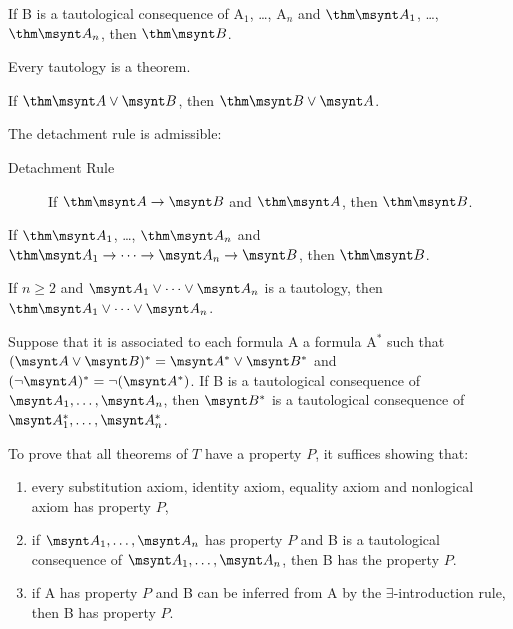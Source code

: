 \begin{theorem}
	If \synt B is a tautological consequence of \synt A$_1$, \dots, 
	\synt A$_n$ and $\thm \msynt A_1$, \dots, $\thm \msynt A_n$,
	then $\thm \msynt B$.
\end{theorem}

\begin{corollary}
	Every tautology is a theorem.
\end{corollary}

\begin{lemma}
	If $\thm \msynt A \lor \msynt B$, then $\thm \msynt B \lor \msynt A$.
\end{lemma}

\begin{fact}
	The detachment rule is admissible: %
	\begin{description}
		\item[Detachment Rule] If $\thm \msynt A \to \msynt B$ and 
		$\thm \msynt A$, then $\thm \msynt B$.
	\end{description}
\end{fact}

\begin{corollary}
	If $\thm \msynt A_1$, \dots, $\thm \msynt A_n$ and
	$\thm \msynt A_1\to \dots\to\msynt A_n\to\msynt B$, then
	$\thm \msynt B$.
\end{corollary}

\begin{lemma}
	If $n\ge 2$ and $\msynt A_1 \lor \dots \lor \msynt A_n$ is a tautology,
	then $\thm \msynt A_1 \lor \dots \lor \msynt A_n$.
\end{lemma}

\begin{fact}
	Suppose that it is associated to each formula \synt A a formula \synt A$^*$
	such that $(\msynt A \lor \msynt B)^* = \msynt A^* \lor \msynt B^*$ and 
	$(\lnot \msynt A)^* = \lnot (\msynt A^*)$. If \synt B is a tautological
	consequence of $\msynt A_1, \dots, \msynt A_n$, then $\msynt B^*$ is a tautological
	consequence of $\msynt A_1^*, \dots, \msynt A_n^*$.
\end{fact}

\begin{fact}
	To prove that all theorems of $T$ have a property $P$, it suffices showing 
	that:
	\begin{enumerate}
		\item every substitution axiom, identity axiom, equality axiom and nonlogical axiom
		has property $P$,
		\item if $\msynt A_1,\dots,\msynt A_n$ has property $P$ and \synt B is a tautological
		consequence of $\msynt A_1,\dots,\msynt A_n$, then \synt B has the property $P$.
		\item if \synt A has property $P$ and \synt B can be inferred from \synt A
		by the $\exists$-introduction rule, then \synt B has property $P$.
	\end{enumerate}
\end{fact}

